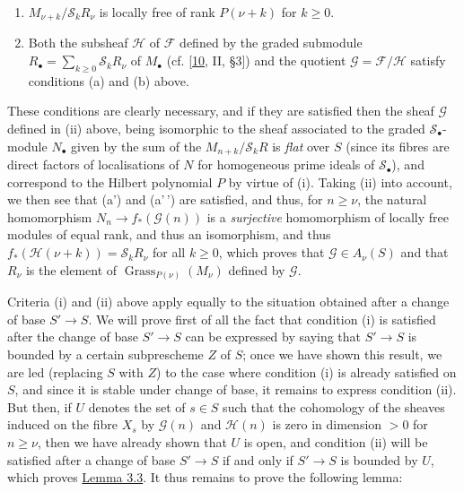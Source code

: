 \documentclass{article}
\providecommand{\tightlist}{%
  \setlength{\itemsep}{0pt}\setlength{\parskip}{0pt}}
\theoremstyle{definition}
\theoremstyle{definition}
\theoremstyle{definition}
\theoremstyle{definition}
\theoremstyle{remark}
\begin{document}
\begin{enumerate}
\def\labelenumi{\roman{enumi}.}
\tightlist
\item
  \(M_{\nu+k}/{\mathcal{S}}_k R_\nu\) is locally free of rank \(P(\nu+k)\) for \(k\geqslant 0\).
\item
  Both the subsheaf \({\mathscr{H}}\) of \({\mathscr{F}}\) defined by the graded submodule \(R_\bullet=\sum_{k\geqslant 0}{\mathscr{S}}_kR_\nu\) of \(M_\bullet\) (cf. {[}\protect\hyperlink{ref-GD1960}{10}, II, §3{]}) and the quotient \({\mathscr{G}}={\mathscr{F}}/{\mathscr{H}}\) satisfy conditions (a) and (b) above.
\end{enumerate}

These conditions are clearly necessary, and if they are satisfied then the sheaf \({\mathscr{G}}\) defined in (ii) above, being isomorphic to the sheaf associated to the graded \({\mathscr{S}}_\bullet\)-module \(N_\bullet\) given by the sum of the \(M_{n+k}/{\mathscr{S}}_kR\) is \emph{flat} over \(S\) (since its fibres are direct factors of localisations of \(N\) for homogeneous prime ideals of \({\mathcal{S}}_\bullet\)), and correspond to the Hilbert polynomial \(P\) by virtue of (i).
Taking (ii) into account, we then see that (a') and (a'\,') are satisfied, and thus, for \(n\geqslant\nu\), the natural homomorphism \(N_n\to f_*({\mathscr{G}}(n))\) is a \emph{surjective} homomorphism of locally free modules of equal rank, and thus an isomorphism, and thus \(f_*({\mathscr{H}}(\nu+k))={\mathcal{S}}_kR_\nu\) for all \(k\geqslant 0\), which proves that \({\mathscr{G}}\in A_\nu(S)\) and that \(R_\nu\) is the element of \(\operatorname{Grass}_{P(\nu)}(M_\nu)\) defined by \({\mathscr{G}}\).

Criteria (i) and (ii) above apply equally to the situation obtained after a change of base \(S'\to S\).
We will prove first of all the fact that condition (i) is satisfied after the change of base \(S'\to S\) can be expressed by saying that \(S'\to S\) is bounded by a certain subprescheme \(Z\) of \(S\);
once we have shown this result, we are led (replacing \(S\) with \(Z\)) to the case where condition (i) is already satisfied on \(S\), and since it is stable under change of base, it remains to express condition (ii).
But then, if \(U\) denotes the set of \(s\in S\) such that the cohomology of the sheaves induced on the fibre \(X_s\) by \({\mathscr{G}}(n)\) and \({\mathscr{H}}(n)\) is zero in dimension \(>0\) for \(n\geqslant\nu\), then we have already shown that \(U\) is open, and condition (ii) will be satisfied after a change of base \(S'\to S\) if and only if \(S'\to S\) is bounded by \(U\), which proves \protect\hyperlink{fga-3-iv-lemma-3.3}{Lemma 3.3}.
It thus remains to prove the following lemma:
\end{document}
